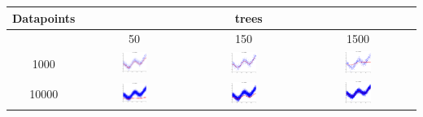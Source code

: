 \begin{tabular}{|c|c|c|c|}
\toprule
Datapoints & \multicolumn{3}{c}{trees} \\ \hline
\midrule
& 50 & 150 & 1500 \\ \hline
1000 & \includegraphics[width=0.25\textwidth]{fig/cos_1k_50} & \includegraphics[width=0.25\textwidth]{fig/cos_1k_150} & \includegraphics[width=0.25\textwidth]{fig/cos_1k_1500} \\ \hline
10000& \includegraphics[width=0.25\textwidth]{fig/cos_10k_50} & \includegraphics[width=0.25\textwidth]{fig/cos_10k_150} & \includegraphics[width=0.25\textwidth]{fig/cos_10k_1500} \\ \hline
\bottomrule
\end{tabular}

